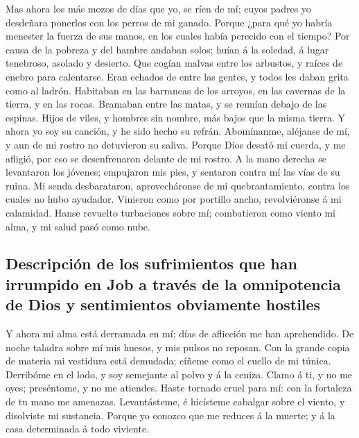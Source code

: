  Mas ahora los más mozos de días que yo, se ríen de mí;
cuyos padres yo desdeñara ponerlos con los perros de mi ganado.
 Porque ¿para qué yo habría menester la fuerza de sus manos,
en los cuales había perecido con el tiempo?  Por causa de la
pobreza y del hambre andaban solos; huían á la soledad, á lugar
tenebroso, asolado y desierto.  Que cogían malvas entre los
arbustos, y raíces de enebro para calentarse.  Eran echados
de entre las gentes, y todos les daban grita como al ladrón.
 Habitaban en las barrancas de los arroyos, en las cavernas
de la tierra, y en las rocas.  Bramaban entre las matas, y
se reunían debajo de las espinas.  Hijos de viles, y hombres
sin nombre, más bajos que la misma tierra.  Y ahora yo soy
su canción, y he sido hecho su refrán.  Abomínanme,
aléjanse de mí, y aun de mi rostro no detuvieron su saliva.
 Porque Dios desató mi cuerda, y me afligió, por eso se
desenfrenaron delante de mi rostro.  A la mano derecha se
levantaron los jóvenes; empujaron mis pies, y sentaron contra mí las
vías de su ruina.  Mi senda desbarataron, aprovecháronse de
mi quebrantamiento, contra los cuales no hubo ayudador. 
Vinieron como por portillo ancho, revolviéronse á mi calamidad.
 Hanse revuelto turbaciones sobre mí; combatieron como
viento mi alma, y mi salud pasó como nube.

\hypertarget{descripciuxf3n-de-los-sufrimientos-que-han-irrumpido-en-job-a-travuxe9s-de-la-omnipotencia-de-dios-y-sentimientos-obviamente-hostiles}{%
\subsection{Descripción de los sufrimientos que han irrumpido en Job a
través de la omnipotencia de Dios y sentimientos obviamente
hostiles}\label{descripciuxf3n-de-los-sufrimientos-que-han-irrumpido-en-job-a-travuxe9s-de-la-omnipotencia-de-dios-y-sentimientos-obviamente-hostiles}}

 Y ahora mi alma está derramada en mí; días de aflicción me
han aprehendido.  De noche taladra sobre mí mis huesos, y
mis pulsos no reposan.  Con la grande copia de materia mi
vestidura está demudada; cíñeme como el cuello de mi túnica.
 Derribóme en el lodo, y soy semejante al polvo y á la
ceniza.  Clamo á ti, y no me oyes; preséntome, y no me
atiendes.  Haste tornado cruel para mí: con la fortaleza de
tu mano me amenazas.  Levantásteme, é hicísteme cabalgar
sobre el viento, y disolviste mi sustancia.  Porque yo
conozco que me reduces á la muerte; y á la casa determinada á todo
viviente.

